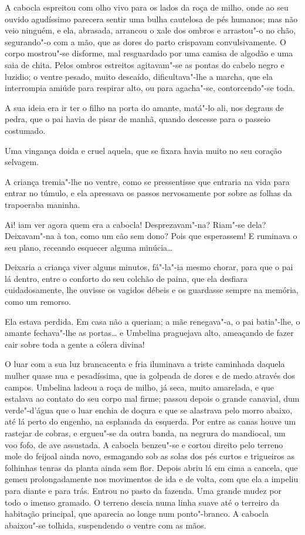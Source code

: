 A cabocla espreitou com olho vivo para os lados da roça de milho, onde
ao seu ouvido agudíssimo parecera sentir uma bulha cautelosa de pés
humanos; mas não veio ninguém, e ela, abrasada, arrancou o xale dos
ombros e arrastou"-o no chão, segurando"-o com a mão, que as dores do
parto crispavam convulsivamente. O corpo mostrou"-se disforme, mal
resguardado por uma camisa de algodão e uma saia de chita. Pelos ombros
estreitos agitavam"-se as pontas do cabelo negro e luzidio; o ventre
pesado, muito descaído, dificultava"-lhe a marcha, que ela interrompia
amiúde para respirar alto, ou para agacha"-se, contorcendo"-se toda.

A sua ideia era ir ter o filho na porta do amante, matá"-lo ali, nos
degraus de pedra, que o pai havia de pisar de manhã, quando descesse
para o passeio costumado.

Uma vingança doida e cruel aquela, que se fixara havia muito no seu
coração selvagem.

A criança tremia"-lhe no ventre, como se pressentisse que entraria na
vida para entrar no túmulo, e ela apressava os passos nervosamente por
sobre as folhas da trapoeraba maninha.

Ai! iam ver agora quem era a cabocla! Desprezavam"-na? Riam"-se dela?
Deixavam"-na à toa, como um cão sem dono? Pois que esperassem! E ruminava
o seu plano, receando esquecer alguma minúcia\ldots{}

Deixaria a criança viver alguns minutos, fá"-la"-ia mesmo chorar, para que
o pai lá dentro, entre o conforto do seu colchão de paina, que ela
desfiara cuidadosamente, lhe ouvisse os vagidos débeis e os guardasse
sempre na memória, como um remorso.

Ela estava perdida. Em casa não a queriam; a mãe renegava"-a, o pai
batia"-lhe, o amante fechava"-lhe as portas\ldots{} e Umbelina praguejava alto,
ameaçando de fazer cair sobre toda a gente a cólera divina!

O luar com a sua luz brancacenta e fria iluminava a triste caminhada
daquela mulher quase nua e pesadíssima, que ia golpeada de dores e de
medo através dos campos. Umbelina ladeou a roça de milho, já seca, muito
amarelada, e que estalava ao contato do seu corpo mal firme; passou
depois o grande canavial, dum verde"-d'água que o luar enchia de doçura e
que se alastrava pelo morro abaixo, até lá perto do engenho, na
esplanada da esquerda. Por entre as canas houve um rastejar de cobras, e
ergueu"-se da outra banda, na negrura do mandiocal, um voo fofo, de ave
assustada. A cabocla benzeu"-se e cortou direito pelo terreno mole do
feijoal ainda novo, esmagando sob as solas dos pés curtos e trigueiros
as folhinhas tenras da planta ainda sem flor. Depois abriu lá em cima a
cancela, que gemeu prolongadamente nos movimentos de ida e de volta, com
que ela a impeliu para diante e para trás. Entrou no pasto da fazenda.
Uma grande mudez por todo o imenso gramado. O terreno descia numa linha
suave até o terreiro da habitação principal, que aparecia ao longe num
ponto"-branco. A cabocla abaixou"-se tolhida, suspendendo o ventre com as
mãos.

